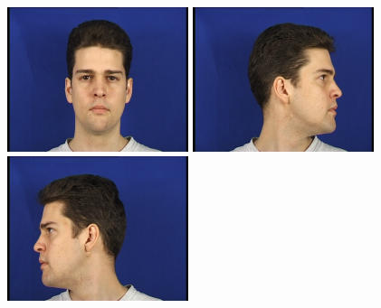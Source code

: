 \begin{figure}
 \begin{center}
  \includegraphics[width=\textwidth/4]{ch4/figures/charles_c1.jpg}
  \includegraphics[width=\textwidth/4]{ch4/figures/charles_l1.jpg}
  \includegraphics[width=\textwidth/4]{ch4/figures/charles_r1.jpg}\\

\end{center}
\end{figure}

